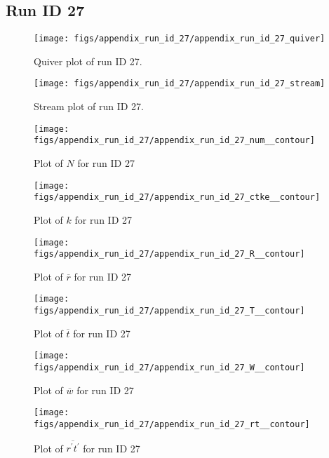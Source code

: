 \subsection{Run ID 27}
\begin{figure}[H]
\centering
\texttt{[image: figs/appendix\_run\_id\_27/appendix\_run\_id\_27\_quiver]}
\caption{Quiver plot of run ID 27.}
\label{fig:appendix_run_id_27_quiver}
\end{figure}


\begin{figure}[H]
\centering
\texttt{[image: figs/appendix\_run\_id\_27/appendix\_run\_id\_27\_stream]}
\caption{Stream plot of run ID 27.}
\label{fig:appendix_run_id_27_stream}
\end{figure}


\begin{figure}[H]
\centering
\texttt{[image: figs/appendix\_run\_id\_27/appendix\_run\_id\_27\_num\_\_contour]}
\caption{Plot of $N$ for run ID 27}
\label{fig:appendix_run_id_27_num__contour}
\end{figure}


\begin{figure}[H]
\centering
\texttt{[image: figs/appendix\_run\_id\_27/appendix\_run\_id\_27\_ctke\_\_contour]}
\caption{Plot of $k$ for run ID 27}
\label{fig:appendix_run_id_27_ctke__contour}
\end{figure}


\begin{figure}[H]
\centering
\texttt{[image: figs/appendix\_run\_id\_27/appendix\_run\_id\_27\_R\_\_contour]}
\caption{Plot of $\overline{r}$ for run ID 27}
\label{fig:appendix_run_id_27_R__contour}
\end{figure}


\begin{figure}[H]
\centering
\texttt{[image: figs/appendix\_run\_id\_27/appendix\_run\_id\_27\_T\_\_contour]}
\caption{Plot of $\overline{t}$ for run ID 27}
\label{fig:appendix_run_id_27_T__contour}
\end{figure}


\begin{figure}[H]
\centering
\texttt{[image: figs/appendix\_run\_id\_27/appendix\_run\_id\_27\_W\_\_contour]}
\caption{Plot of $\overline{w}$ for run ID 27}
\label{fig:appendix_run_id_27_W__contour}
\end{figure}


\begin{figure}[H]
\centering
\texttt{[image: figs/appendix\_run\_id\_27/appendix\_run\_id\_27\_rt\_\_contour]}
\caption{Plot of $\overline{r^\prime t^\prime}$ for run ID 27}
\label{fig:appendix_run_id_27_rt__contour}
\end{figure}


